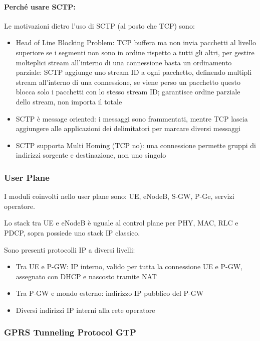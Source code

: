 \paragraph{Perché usare SCTP:} Le motivazioni dietro l'uso di SCTP (al posto che TCP) sono: 
\begin{itemize}
    \item Head of Line Blocking Problem: TCP buffera ma non invia pacchetti al livello superiore se i segmenti non sono in ordine rispetto a tutti gli altri, per gestire molteplici stream all'interno di una connessione basta un ordinamento parziale: SCTP aggiunge uno stream ID a ogni pacchetto, definendo multipli stream all'interno di una connessione, se viene perso un pacchetto questo blocca solo i pacchetti con lo stesso stream ID; garantisce ordine parziale dello stream, non importa il totale
    
    \item SCTP è message oriented: i messaggi sono frammentati, mentre TCP lascia aggiungere alle applicazioni dei delimitatori per marcare diversi messaggi
    
    \item SCTP supporta Multi Homing (TCP no): una connessione permette gruppi di indirizzi sorgente e destinazione, non uno singolo
\end{itemize}

\subsubsection{User Plane}

I moduli coinvolti nello user plane sono: UE, eNodeB, S-GW, P-Ge, servizi operatore. 

Lo stack tra UE e eNodeB è uguale al control plane per PHY, MAC, RLC e PDCP, sopra possiede uno stack IP classico. 

Sono presenti protocolli IP a diversi livelli: 
\begin{itemize}
    \item Tra UE e P-GW: IP interno, valido per tutta la connessione UE e P-GW, assegnato con DHCP e nascosto tramite NAT
    
    \item Tra P-GW e mondo esterno: indirizzo IP pubblico del P-GW
    
    \item Diversi indirizzi IP interni alla rete operatore
\end{itemize}

\subsubsection{GPRS Tunneling Protocol GTP}

